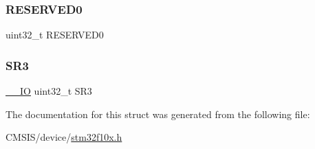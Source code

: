 \mbox{\label{struct_f_s_m_c___bank3___type_def_af86c61a5d38a4fc9cef942a12744486b}} 
\subsubsection{\texorpdfstring{RESERVED0}{RESERVED0}}
{\footnotesize\ttfamily uint32\+\_\+t R\+E\+S\+E\+R\+V\+E\+D0}

\mbox{\label{struct_f_s_m_c___bank3___type_def_af30c34f7c606cb9416a413ec5fa36491}} 
\subsubsection{\texorpdfstring{SR3}{SR3}}
{\footnotesize\ttfamily \mbox{\hyperlink{core__sc300_8h_aec43007d9998a0a0e01faede4133d6be}{\+\_\+\+\_\+\+IO}} uint32\+\_\+t S\+R3}



The documentation for this struct was generated from the following file\+:\begin{DoxyCompactItemize}
\item 
C\+M\+S\+I\+S/device/\mbox{\hyperlink{stm32f10x_8h}{stm32f10x.\+h}}\end{DoxyCompactItemize}
